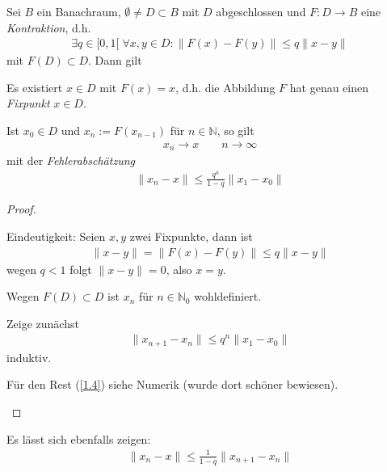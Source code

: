 \begin{theorem} \label{1.3}
  Sei $B$ ein Banachraum, $\emptyset \neq D \subset B$ mit $D$ abgeschlossen und $F: D \to B$ eine \emph{Kontraktion}, d.h.
  \begin{align*}
    \exists q \in [0,1[ \; \forall x,y \in D : \|F(x) - F(y)\| \le q\|x-y\|
  \end{align*}
  mit $F(D) \subset D$. Dann gilt
  \begin{enum-arab}
  \item
    Es existiert $x\in D$ mit $F(x)=x$, d.h. die Abbildung $F$ hat genau einen \emph{Fixpunkt} $x\in D$.
  \item
    Ist $x_0 \in D$ und $x_n := F(x_{n-1})$ für $n\in \mathbb{N}$, so gilt
    \begin{align*}
      x_n \to x \qquad n \to \infty
    \end{align*}
    mit der \emph{Fehlerabschätzung}
    \begin{align*}
      \|x_n - x\| \le \frac{q^n}{1-q} \|x_1 - x_0\|
    \end{align*}
  \end{enum-arab}
  \begin{proof}
    \begin{enum-arab}
    \item
      Eindeutigkeit: Seien $x,y$ zwei Fixpunkte, dann ist
      \begin{align*}
        \|x-y\| = \|F(x) - F(y)\| \le q \|x-y\|
      \end{align*}
      wegen $q < 1$ folgt $\|x-y\| = 0$, also $x=y$.
    \item
      Wegen $F(D) \subset D$ ist $x_n$ für $n\in \mathbb{N}_0$ wohldefiniert.

      Zeige zunächst
      \begin{align*}
        \|x_{n+1} - x_n\| \le q^n \|x_1 - x_0\|
      \end{align*}
      induktiv.

      Für den Rest (\ref{1.4}) siehe Numerik (wurde dort schöner bewiesen).
    \end{enum-arab}
  \end{proof}
\end{theorem}

\begin{notice} \label{1.4}
  Es lässt sich ebenfalls zeigen:
  \begin{align*}
    \|x_n - x\| \le \frac 1{1-q} \|x_{n+1} -x_n \|
  \end{align*}
\end{notice}
